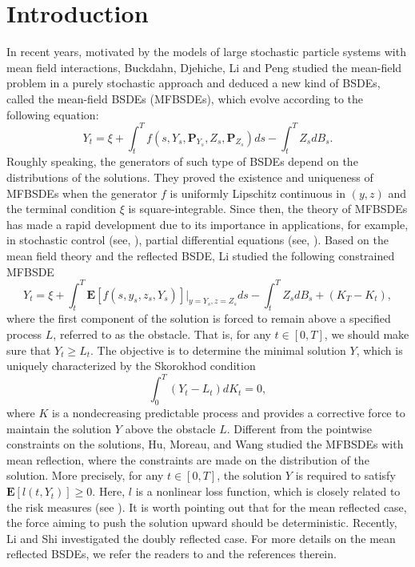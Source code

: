 \documentclass[10pt]{article}%
\numberwithin{equation}{section}
\def \E{\mathbf{E}}
\def \P{\mathbf{P}}
\begin{document}
\section{Introduction}
 In recent years, motivated by the models of large stochastic particle systems with mean field interactions, Buckdahn, Djehiche, Li and Peng \cite{BDLP} studied the mean-field problem in a purely stochastic approach and deduced a new kind of BSDEs, called the mean-field BSDEs (MFBSDEs), which evolve according to the following equation:
 $$Y_t=\xi+\int_{t}^{T}f(s,Y_s,\P_{Y_s},Z_s,\P_{Z_s})ds- \int_t^T Z_s dB_s.$$ Roughly speaking, the generators of such type of BSDEs depend on the distributions of the solutions. They proved the existence and uniqueness of MFBSDEs when the generator $f$ is uniformly Lipschitz continuous in $(y,z)$ and the terminal condition $\xi$ is square-integrable.  Since then, the theory of MFBSDEs has made a rapid development due to its importance in applications, for example, in stochastic control (see, \cite{BDL,DTT,LJ}), partial differential equations (see, \cite{BLP,HHTW,LJ2}). Based on the  mean field theory and the reflected BSDE,  Li \cite{LJ1} studied  the following constrained MFBSDE
\begin{equation*}
 Y_t=\xi+\int_t^T \E\left[f(s,y_s,z_s,Y_s)\right]|_{y=Y_s,z=Z_s}ds-\int_t^T Z_s dB_s+(K_T-K_t),
\end{equation*}
 where the first component of the solution is forced to remain above a specified process $L$, referred to as the obstacle. That is, for any $t\in[0,T]$, we should make sure that  $Y_t\geq L_t$. The  objective is to determine the minimal solution $Y$, which is uniquely characterized by the Skorokhod condition 
 $$\int_{0}^{T} (Y_t-L_t) dK_t=0,$$ 
 where $K$ is a nondecreasing predictable process and provides a corrective force to maintain the solution $Y$ above the obstacle $L$. 
 Different from the pointwise constraints on the solutions, Hu, Moreau, and Wang \cite{HMW} studied the MFBSDEs with mean reflection, where the constraints are made on the distribution of the solution. More precisely, for any $t\in[0,T]$, the solution $Y$ is required to satisfy 
 $\mathbf{E}\left[l\left(t,Y_t\right)\right]\geq 0$. Here, $l$ is a nonlinear loss function, which is closely related to the risk measures (see \cite{BEH}). It is worth pointing out that for the mean reflected case, the force aiming to push the solution upward should be deterministic.  Recently, Li and Shi \cite{LS} investigated the doubly reflected case. %
 For more details on the mean reflected BSDEs, we refer the readers to \cite{CHM,FS,HHLLW,L,LU} and the references therein.   
\end{document}
